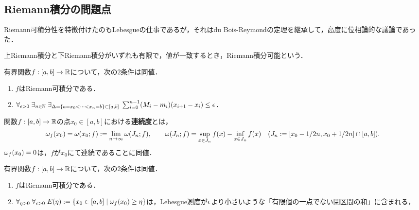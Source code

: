 \documentclass[uplatex, dvipdfmx]{jsreport}
\begin{document}
\subsection{Riemann積分の問題点}

\begin{tcolorbox}[colframe=ForestGreen, colback=ForestGreen!10!white,breakable,colbacktitle=ForestGreen!40!white,coltitle=black,fonttitle=\bfseries\sffamily,
title=]
    Riemann可積分性を特徴付けたのもLebesgueの仕事であるが，それはdu Bois-Reymondの定理を継承して，高度に位相論的な議論であった．

\end{tcolorbox}

\begin{definition}
    上Riemann積分と下Riemann積分がいずれも有限で，値が一致するとき，Riemann積分可能という．
\end{definition}

\begin{corollary}[Darbouxの定理(1878)の系]
    有界関数$f:[a,b]\to\mathbb{R}$について，次の2条件は同値．
    \begin{enumerate}
        \item $f$はRiemann可積分である．
        \item $\forall_{\epsilon>0}\;\exists_{n\in\mathbb{N}}\;\exists_{\Delta=\left\{a=x_0<\cdots<x_n=b\right\}\subset[a,b]}\;\sum^{n-1}_{i=0}(M_i-m_i)(x_{i+1}-x_i)\le\epsilon$．
    \end{enumerate}
\end{corollary}

\begin{definition}[oscillation]
    関数$f:[a,b]\to\mathbb{R}$の点$x_0\in[a,b]$における\textbf{連続度}とは，
    \[\omega_f(x_0)=\omega(x_0;f):=\lim_{n\to\infty}\omega(J_n;f),\qquad\omega(J_n;f)=\sup_{x\in J_n}f(x)-\inf_{x\in J_n}f(x)\quad(J_n:=[x_0-1/2n,x_0+1/2n]\cap[a,b]).\]
    $\omega_f(x_0)=0$は，$f$が$x_0$にて連続であることに同値．
\end{definition}

\begin{theorem}
    有界関数$f:[a,b]\to\mathbb{R}$について，次の2条件は同値．
    \begin{enumerate}
        \item $f$はRiemann可積分である．
        \item $\forall_{\eta>0}\;\forall_{\epsilon>0}\;E(\eta):=\left\{x_0\in[a,b]\mid\omega_f(x_0)\ge\eta\right\}$は，Lebesgue測度が$\epsilon$より小さいような「有限個の一点でない閉区間の和」に含まれる，
    \end{enumerate}
\end{theorem}
\end{document}
